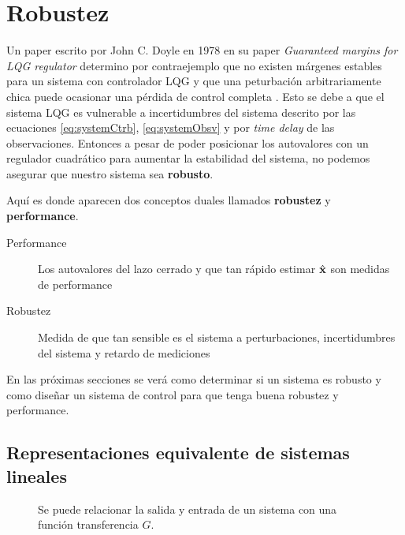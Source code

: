 
\chapter{Robustez}
Un paper escrito por John C. Doyle en 1978 en su paper \textit{Guaranteed margins for LQG regulator} determino por contraejemplo que no existen márgenes estables para un sistema con controlador LQG y que una peturbación arbitrariamente chica puede ocasionar una pérdida de control completa \citep{doyle1978guaranteed}. Esto se debe a que el sistema LQG es vulnerable a incertidumbres del sistema descrito por las ecuaciones \eqref{eq:systemCtrb}, \eqref{eq:systemObsv} y por \textit{time delay} de las observaciones. Entonces a pesar de poder posicionar los autovalores con un regulador cuadrático para aumentar la estabilidad del sistema, no podemos asegurar que nuestro sistema sea \textbf{robusto}.

Aquí es donde aparecen dos conceptos duales llamados \textbf{robustez} y \textbf{performance}. 

\begin{description}
	\item[Performance] Los autovalores del lazo cerrado y que tan rápido estimar $\hat{\mathbf{x}}$ son medidas de performance
	\item[Robustez] Medida de que tan sensible es el sistema a perturbaciones, incertidumbres del sistema y retardo de mediciones
\end{description}

En las próximas secciones se verá como determinar si un sistema es robusto y como diseñar un sistema de control para que tenga buena robustez y performance.

\section{Representaciones equivalente de sistemas lineales}

\begin{figure}[htb!]
	\centering
{}
\caption{Se puede relacionar la salida y entrada de un sistema con una función transferencia $G$.}
\end{figure}

